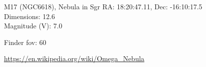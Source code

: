 \begin{block}{M17 (NGC6618), Nebula in Sgr}
    RA: 18:20:47.11, Dec: -16:10:17.5 \\ 
    Dimensions: 12.6 \\ 
    Magnitude (V): 7.0



    Finder fov: 60 

    \url{https://en.wikipedia.org/wiki/Omega_Nebula} 
\end{block}